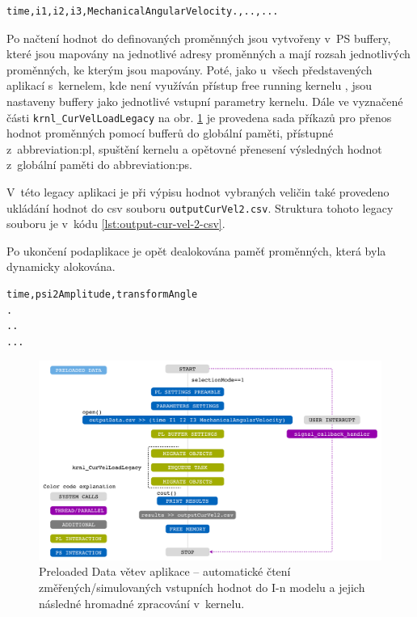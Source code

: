 \documentclass[a4paper, twoside, 11pt]{article}
\begin{document}
	\begin{lstlisting}[language={Text}, caption={Struktura souboru outputData, ze kterého jsou načítány hodnoty pro akcelerovaný kernel.}, label={lst:output-data-csv-struktura}]
time,i1,i2,i3,MechanicalAngularVelocity.,..,...
\end{lstlisting}
	Po načtení hodnot do definovaných proměnných jsou vytvořeny v~PS buffery, které jsou mapovány na jednotlivé adresy proměnných a mají rozsah jednotlivých proměnných, ke kterým jsou mapovány. Poté, jako u~všech představených aplikací s~kernelem, kde není využíván přístup free running kernelu \cite{xilinx-github-host-stream-free-running-kernel}, jsou nastaveny buffery jako jednotlivé vstupní parametry kernelu. Dále ve vyznačené části \texttt{krnl\_CurVelLoadLegacy} na obr. \ref{fig:preloaded-data} je provedena sada příkazů pro přenos hodnot proměnných pomocí bufferů do globální paměti, přístupné z~\gls{abbreviation:pl}, spuštění kernelu a opětovné přenesení výsledných hodnot z~globální paměti do \gls{abbreviation:ps}.\par
	V~této legacy aplikaci je při výpisu hodnot vybraných veličin také provedeno ukládání hodnot do csv souboru \texttt{outputCurVel2.csv}. Struktura tohoto legacy souboru je v~kódu \ref{lst:output-cur-vel-2-csv}.\par
	Po ukončení podaplikace je opět dealokována paměť proměnných, která byla dynamicky alokována.

	\begin{lstlisting}[language={Text}, caption={Struktura souboru outputCurVel2, do něhož jsou umisťovány výstupní hodnoty vybraných veličin, vypočtených pomocí akcelerované aplikace.}, label={lst:output-cur-vel-2-csv}]
time,psi2Amplitude,transformAngle
.
..
...\end{lstlisting}



		\begin{figure}[htbp!]
		   \centering
		   \includegraphics[width=1\textwidth]{src/pdf/preloaded-data.pdf}
		   \caption{Preloaded Data větev aplikace – automatické čtení změřených/simulovaných vstupních hodnot do I-n modelu a jejich následné hromadné zpracování v~kernelu.}
		   \label{fig:preloaded-data}
	   \end{figure}
\end{document}
